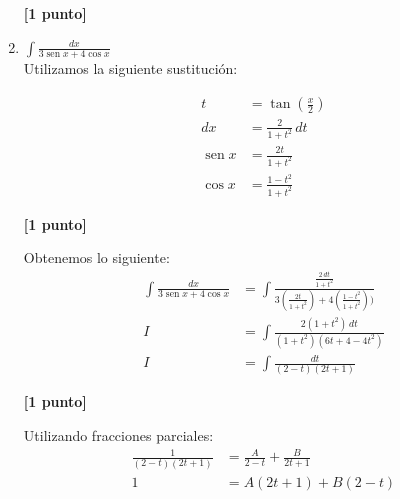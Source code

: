 \documentclass[a4paper,10pt]{article}
\newcommand{\dis}{\displaystyle}
\def\sin{\operatorname{sen}}
\begin{document}
\begin{enumerate}
\dotfill \textbf{[1 punto]}





\newpage
\item $\dis \int \frac{dx}{3\sin x+4\cos x}$\\

Utilizamos la siguiente sustitución:\\

\begin{minipage}{.3\textwidth}
\raggedright
\begin{align*}
t  &= \tan \left(\frac{x}{2}\right)      \\
dx &= \frac{2}{1+t^2}  \, dt \\
\sin x &= \frac{2t}{1+t^2} \\
\cos x &= \frac{1-t^2}{1+t^2}
\end{align*}
\end{minipage}%
\begin{minipage}{.3\textwidth}
\raggedleft
{}
\end{minipage}

\dotfill \textbf{[1 punto]}


Obtenemos lo siguiente:
\begin{align*}
 \dis \int \frac{dx}{3\sin x+4\cos x}  &=   \dis \int \frac{\frac{2 \, dt}{1+t^2}}{3(\frac{2t}{1+t^2})+4(\frac{1-t^2}{1+t^2}))} \\
I  &=   \dis  \int \frac{2(1+t^2) \, dt}{(1+t^2)(6t+4-4t^2)} \\
I  &=   \dis \int \frac{ dt}{(2-t)(2t+1)}
\end{align*}

\dotfill \textbf{[1 punto]}

Utilizando fracciones parciales:
\begin{align*}
 \dis  \frac{ 1}{(2-t)(2t+1)}  &=  \dis  \frac{A}{2-t} + \dis  \frac{B}{2t+1} \\
 \dis  1  &=  \dis  A(2t+1)+ \dis  B(2-t)
\end{align*}


\end{enumerate}
\end{document}
